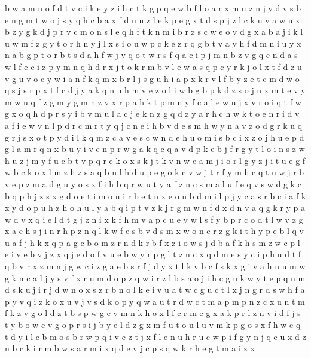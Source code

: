 \documentclass{article}
\begin{document}
b w a m n o f d t v c i k e y z
i h c t k g p q e w b f l o a r x m u z n j y d v s
b e n
g m t w o j s y q h c b a x f d u n z l e k p
e g x t d s p j z l c k u v
a w u x b z y g k d j p r v c m o n s l e q h f t
k n m i b r z s c w e o v d g x a
b a j i k l u w m f z g y t o r h n
y
j l x s i o u w p c k e z r q g b t v a y h f d m n
i u y x n a b g p t o
r b t s d a h f w j v q
o t w r s f q a c i p j m n b z v g
q c n d a s
w l f e c i z p y m n q h d r x j t o k
r m b v l
e w a s q p c y r k j o l x t f d z u v
g u v o c y w i a n f k q m x b r l j s
g u h i a p x k r v l f b y z e t c m d w o q s j
s r p x t f c d j y a k q n u h m v e z o l i w b g
b p k d z s o j n x m t e
v y m w u
q f z g m
y g m n z v x r p a
h k t p m n y f c a l e w u j x v r o i q
t f w g x o q h d p r s y i b v m u l a c j e k n z
g q d z y a r h
c h w k t o e n r i d v a
f i e w v n l p d r c m
r t y q j c n e i h b v
d e s m
h w y n a v z o d g r k u q
g r j s x o t p y d i l k q m z c a v e
s c w n d e h u o m i
s b c i x z o j h u e p d g l a m r q n
x b u y i v e n p r w g a k q
c q a v d p k e b j f r g y t l o i n s z w h u
z j m y f u c b t v p q r e k o x s
k j
t k v n w e a m j i o r l g y z
j i t u e g f w b c k o x l m z h
z s a q b n l h d u p e g o k c v w j t r f y m
h c q t n w j r b v e p z m a d g u y o s x f i
h b q r w u t y a f z n c s m
a l u f e q v s w d g k
c b q p h j z s x g d o e t i m
o n i r b e t
n x e o u b d m i l p j y c a s
r b c i a f k x y d o p u h z
h
o h u l y a b q i p t v z k j r g m w n f d x
d n v a q g
k r y p a w d v x q i e l
d t g j z n i x k f h m v a p c u e y w l s
f y b p r c o d t l w v z g x a e h s j i n
r h p z n q l k w f e s b v
d s m x w o n c r z g k i t h y p e b l q v u a f j
h k x q p a g c b o m z r
n d k r b f x z i o w s j
d b a f k h s m z w c p l e i v
e b v j z
x q j e d o
f v u e b w y r p g l t z n c x q d m
e s y c i p h u d t f q b v r x z m n j g w
c i z g a e b s r f j d y x t l k v
b c f s k x g i v a h n u m w
g k n c a l j y s v f x r u m d o p z q w i
r z l b s a o j i h c g u k w y t e p q n m d
s
k u j i r
j d w n o x
s z r b n o l k e i v u a t w c g
u c t l x j n g r d s w h f a p y v q i z k o
x u
v j
v s d
k o p y q w a u t r d
w c t m a p
m p n z c
x u n t m f k z v g o l d
z t b s p w g e v m n k h o x l f c r
m e g x a k p r l z n v i d f j s t y b o w c
v g
o p r s i j b y e l d z g x m f u t
o u l
u v m k p g o s x f h w e q t d y i l c b
m o s b r w p q i v c z t j x f l e n u h
r
u c w p i f g y n j q e
u x d z n b c k i r m
b w s a r m i x q d e
v j c p s q w k r h e g t m a i z x
\end{document}

